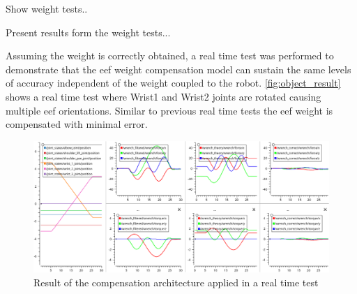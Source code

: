 
\par Show weight tests..


\par Present results form the weight tests... 

\par Assuming the weight is correctly obtained, a real time test was performed to demonstrate that the \ac{eef} weight compensation model can sustain the same levels of accuracy independent of the weight coupled to the robot. \autoref{fig:object_result} shows a real time test where Wrist1 and Wrist2 joints are rotated causing multiple \ac{eef} orientations. Similar to previous real time tests the \ac{eef} weight is compensated with minimal error.

\begin{figure}[h]
    \centering
    \includegraphics[width=0.9\linewidth]{figs/chp6/object_result.png}
    \caption{Result of the compensation architecture applied in a real time test}
    \label{fig:object_result}
\end{figure}

